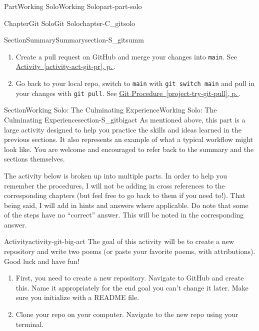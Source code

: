 \documentclass[twoside,10pt,]{book}
\newcommand{\xreffont}{\relax}
\newcommand{\mono}[1]{\texttt{#1}}
\begin{document}
\begin{partptx}{Part}{Working Solo}{}{Working Solo}{}{}{part-part-solo}
\begin{chapterptx}{Chapter}{Git Solo}{}{Git Solo}{}{}{chapter-C_gitsolo}
\begin{sectionptx}{Section}{Summary}{}{Summary}{}{}{section-S_gitsumm}
\begin{enumerate}
%
\item{}Create a pull request on GitHub and merge your changes into \mono{main}. See \hyperref[activity-act-git-pr]{Activity~{\xreffont\ref{activity-act-git-pr}}, p.\,\pageref{activity-act-git-pr}}.%
\item{}Go back to your local repo, switch to \mono{main} with \mono{git switch main} and pull in your changes with \mono{git pull}. See \hyperref[project-try-git-pull]{Git Procedure~{\xreffont\ref{project-try-git-pull}}, p.\,\pageref{project-try-git-pull}}.%
\end{enumerate}
%
\end{sectionptx}
%
%
\typeout{************************************************}
\typeout{************************************************}
%
\begin{sectionptx}{Section}{Working Solo: The Culminating Experience}{}{Working Solo: The Culminating Experience}{}{}{section-S_gitbigact}
%
As mentioned above, this part is a large activity designed to help you practice the skills and ideas learned in the previous sections. It also represents an example of what a typical workflow might look like. You are welcome and encouraged to refer back to the summary and the sections themselves.%
\par
The activity below is broken up into multiple parts. In order to help you remember the procedures, I will not be adding in cross references to the corresponding chapters (but feel free to go back to them if you need to!). That being said, I will add in hints and answers where applicable. Do note that some of the steps have no ``correct'' answer. This will be noted in the corresponding answer.%
\begin{activity}{Activity}{}{activity-git-big-act}%
The goal of this activity will be to create a new repository and write two poems (or paste your favorite poems, with attributions). Good luck and have fun!%
\begin{enumerate}[font=\bfseries,label=(\alph*),ref=\alph*]%
\item\label{task-git-ba-newrepo}First, you need to create a new repository. Navigate to GitHub and create this. Name it appropriately for the end goal \textemdash{} you can't change it later. Make sure you initialize with a README file.%
\item\label{task-git-ba-clone}Clone your repo on your computer. Navigate to the new repo using your terminal.%
\par\smallskip%

\end{enumerate}
\end{activity}
\end{sectionptx}
\end{chapterptx}
\end{partptx}
\end{document}
